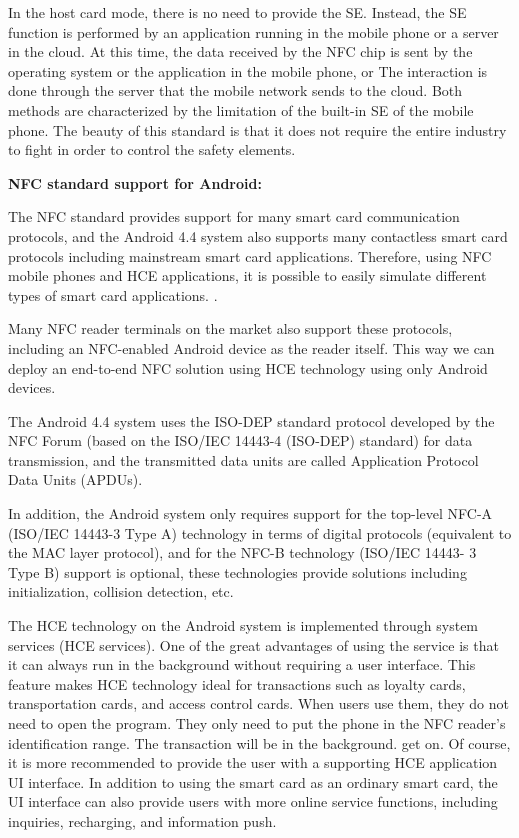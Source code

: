 \documentclass[journal]{IEEEtran}
\begin{document}
In the host card mode, there is no need to provide the SE. Instead, the SE function is performed by an application running in the mobile phone or a server in the cloud. At this time, the data received by the NFC chip is sent by the operating system or the application in the mobile phone, or The interaction is done through the server that the mobile network sends to the cloud. Both methods are characterized by the limitation of the built-in SE of the mobile phone. The beauty of this standard is that it does not require the entire industry to fight in order to control the safety elements.

\textbf{NFC standard support for Android:}

The NFC standard provides support for many smart card communication protocols, and the Android 4.4 system also supports many contactless smart card protocols including mainstream smart card applications. Therefore, using NFC mobile phones and HCE applications, it is possible to easily simulate different types of smart card applications. .

Many NFC reader terminals on the market also support these protocols, including an NFC-enabled Android device as the reader itself. This way we can deploy an end-to-end NFC solution using HCE technology using only Android devices.

The Android 4.4 system uses the ISO-DEP standard protocol developed by the NFC Forum (based on the ISO/IEC 14443-4 (ISO-DEP) standard) for data transmission, and the transmitted data units are called Application Protocol Data Units (APDUs).

In addition, the Android system only requires support for the top-level NFC-A (ISO/IEC 14443-3 Type A) technology in terms of digital protocols (equivalent to the MAC layer protocol), and for the NFC-B technology (ISO/IEC 14443- 3 Type B) support is optional, these technologies provide solutions including initialization, collision detection, etc.

The HCE technology on the Android system is implemented through system services (HCE services). One of the great advantages of using the service is that it can always run in the background without requiring a user interface. This feature makes HCE technology ideal for transactions such as loyalty cards, transportation cards, and access control cards. When users use them, they do not need to open the program. They only need to put the phone in the NFC reader's identification range. The transaction will be in the background. get on. Of course, it is more recommended to provide the user with a supporting HCE application UI interface. In addition to using the smart card as an ordinary smart card, the UI interface can also provide users with more online service functions, including inquiries, recharging, and information push.
\end{document}
